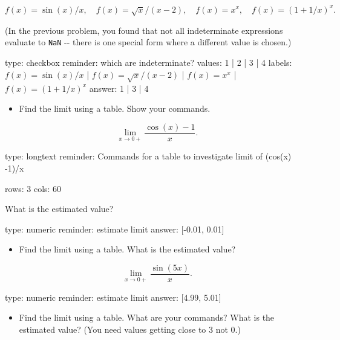 \documentclass[12pt]{article}
\begin{document}
\[
f(x) = \sin(x)/x, \quad
f(x) = \sqrt{x}/(x-2), \quad
f(x) = x^x, \quad
f(x) = (1 + 1/x)^x.
\]

(In the previous problem, you found that not all indeterminate
expressions evaluate to \texttt{NaN} -{}- there is one special form
where a different value is chosen.)

\begin{answer}
type: checkbox
reminder: which are indeterminate?
values: 1 | 2 | 3 | 4
labels: \( f(x) = \sin(x)/x \) | \( f(x) = \sqrt{x}/(x-2) \) | \( f(x) = x^x \) | \( f(x) = (1 + 1/x)^x \)
answer: 1 | 3 | 4
\end{answer}

\begin{itemize}
\itemsep1pt\parskip0pt
\item
  Find the limit using a table. Show your commands.
\end{itemize}

\[
\lim_{x \rightarrow 0+} \frac{\cos(x) - 1}{x}.
\]

\begin{answer}
type: longtext
reminder: Commands for a table to investigate limit of (cos(x) -1)/x

rows: 3
cols: 60
\end{answer}

What is the estimated value?

\begin{answer}
    type: numeric
    reminder: estimate limit
    answer: [-0.01, 0.01]

\end{answer}

\begin{itemize}
\itemsep1pt\parskip0pt
\item
  Find the limit using a table. What is the estimated value?
\end{itemize}

\[
\lim_{x \rightarrow 0+} \frac{\sin(5x)}{x}.
\]

\begin{answer}
    type: numeric
    reminder: estimate limit
    answer: [4.99, 5.01]

\end{answer}

\begin{itemize}
\itemsep1pt\parskip0pt
\item
  Find the limit using a table. What are your commands? What is the
  estimated value? (You need values getting close to $3$ not $0$.)
\end{itemize}
\end{document}
